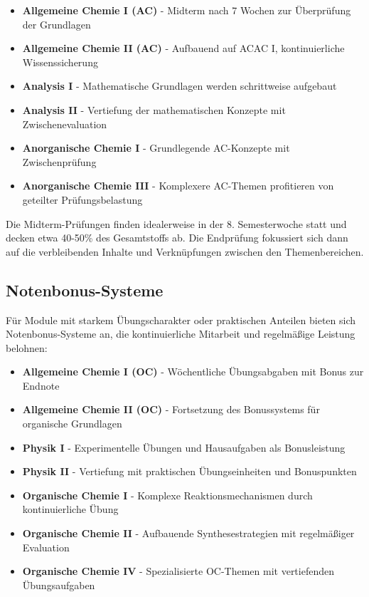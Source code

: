 \documentclass[a4paper]{article}
\begin{document}
\begin{itemize}
    \item \textbf{Allgemeine Chemie I (AC)} - Midterm nach 7 Wochen zur Überprüfung der Grundlagen
    \item \textbf{Allgemeine Chemie II (AC)} - Aufbauend auf ACAC I, kontinuierliche Wissenssicherung
    \item \textbf{Analysis I} - Mathematische Grundlagen werden schrittweise aufgebaut
    \item \textbf{Analysis II} - Vertiefung der mathematischen Konzepte mit Zwischenevaluation
    \item \textbf{Anorganische Chemie I} - Grundlegende AC-Konzepte mit Zwischenprüfung
    \item \textbf{Anorganische Chemie III} - Komplexere AC-Themen profitieren von geteilter Prüfungsbelastung
\end{itemize}

Die Midterm-Prüfungen finden idealerweise in der 8. Semesterwoche statt und decken etwa 40-50\% des Gesamtstoffs ab. Die Endprüfung fokussiert sich dann auf die verbleibenden Inhalte und Verknüpfungen zwischen den Themenbereichen.

\subsection{Notenbonus-Systeme}

Für Module mit starkem Übungscharakter oder praktischen Anteilen bieten sich Notenbonus-Systeme an, die kontinuierliche Mitarbeit und regelmäßige Leistung belohnen:

\begin{itemize}
    \item \textbf{Allgemeine Chemie I (OC)} - Wöchentliche Übungsabgaben mit Bonus zur Endnote
    \item \textbf{Allgemeine Chemie II (OC)} - Fortsetzung des Bonussystems für organische Grundlagen
    \item \textbf{Physik I} - Experimentelle Übungen und Hausaufgaben als Bonusleistung
    \item \textbf{Physik II} - Vertiefung mit praktischen Übungseinheiten und Bonuspunkten
    \item \textbf{Organische Chemie I} - Komplexe Reaktionsmechanismen durch kontinuierliche Übung
    \item \textbf{Organische Chemie II} - Aufbauende Synthesestrategien mit regelmäßiger Evaluation
    \item \textbf{Organische Chemie IV} - Spezialisierte OC-Themen mit vertiefenden Übungsaufgaben
\end{itemize}
\end{document}

